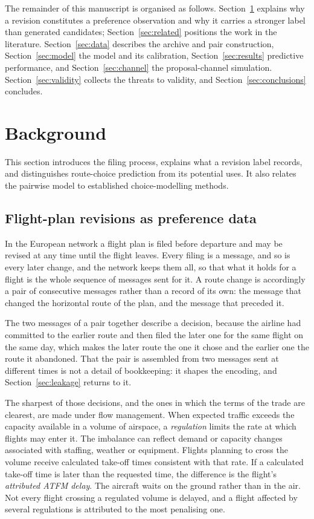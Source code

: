 \documentclass[preprint,authoryear,12pt]{elsarticle}
\begin{document}
The remainder of this manuscript is organised as follows.
Section~\ref{sec:background} explains why a revision constitutes a
preference observation and why it carries a stronger label than
generated candidates; Section~\ref{sec:related} positions the work in
the literature. Section~\ref{sec:data} describes the archive and pair
construction, Section~\ref{sec:model} the model and its calibration,
Section~\ref{sec:results} predictive performance, and
Section~\ref{sec:channel} the proposal-channel simulation.
Section~\ref{sec:validity} collects the threats to validity, and
Section~\ref{sec:conclusions} concludes.

\section{Background}
\label{sec:background}

This section introduces the filing process, explains what a revision
label records, and distinguishes route-choice prediction from its
potential uses. It also relates the pairwise model to established
choice-modelling methods.

\subsection{Flight-plan revisions as preference data}

In the European network a flight plan is filed before departure and may
be revised at any time until the flight leaves. Every filing is a
message, and so is every later change, and the network keeps them all, so
that what it holds for a flight is the whole sequence of messages sent for
it. A route change is accordingly a pair of consecutive messages rather
than a record of its own: the message that changed the horizontal route of
the plan, and the message that preceded it.

The two messages of a pair together describe a decision, because the airline had committed to the earlier
route and then filed the later one for the same flight on the same day,
which makes the later route the one it chose and the earlier one the route
it abandoned. That the pair
is assembled from two messages sent at different times is not a
detail of bookkeeping: it shapes the encoding, and
Section~\ref{sec:leakage} returns to it.

The sharpest of those decisions, and the ones in which the terms of the
trade are clearest, are made under flow management. When expected traffic exceeds the capacity available in a volume of
airspace, a \emph{regulation} limits the rate at which flights may enter
it. The imbalance can reflect demand or capacity changes associated with
staffing, weather or equipment.
Flights planning to cross the volume receive calculated take-off times
consistent with that rate. If a calculated take-off time is later than
the requested time, the difference is the flight's \emph{attributed ATFM
delay}. The aircraft waits on the ground rather than in the air.
Not every flight crossing a regulated volume is delayed, and a flight
affected by several regulations is attributed to the most penalising one.
\end{document}
